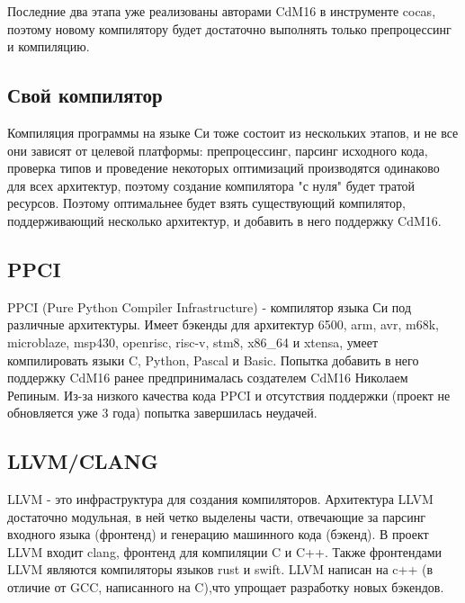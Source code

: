 \documentclass[a4paper,14pt]{extarticle}
\begin{document}
Последние два этапа уже реализованы авторами CdM16 в инструменте cocas, поэтому новому компилятору будет достаточно выполнять только препроцессинг и компиляцию. 

\subsection{Свой компилятор}

Компиляция программы на языке Си тоже состоит из нескольких этапов, и не все они зависят от целевой платформы:
препроцессинг, парсинг исходного кода, проверка типов и проведение некоторых оптимизаций производятся одинаково 
для всех архитектур, поэтому создание компилятора "с нуля" будет тратой ресурсов. 
Поэтому оптимальнее будет взять существующий компилятор, поддерживающий несколько архитектур, и добавить в него
поддержку CdM16.

\subsection{PPCI}

PPCI (Pure Python Compiler Infrastructure)\cite{ppci} - компилятор языка Си под различные архитектуры. Имеет бэкенды для архитектур 6500, arm, avr, m68k, microblaze, msp430, openrisc, risc-v, stm8, x86\_64 и xtensa, умеет компилировать языки C, Python, Pascal и Basic.   Попытка добавить в него поддержку CdM16 ранее предпринималась создателем CdM16 Николаем Репиным. Из-за низкого качества кода PPCI и отсутствия поддержки (проект не обновляется уже 3 года) попытка завершилась неудачей.

\subsection{LLVM/CLANG}
LLVM - это инфраструктура для создания компиляторов.  Архитектура LLVM достаточно модульная, в ней четко выделены части, отвечающие за парсинг входного языка (фронтенд) и генерацию машинного кода (бэкенд). В проект LLVM входит  clang, фронтенд для компиляции C и C++. Также фронтендами LLVM являются компиляторы языков rust и swift. LLVM написан на c++ (в отличие от GCC, написанного на C),что упрощает разработку новых бэкендов.
\end{document}

